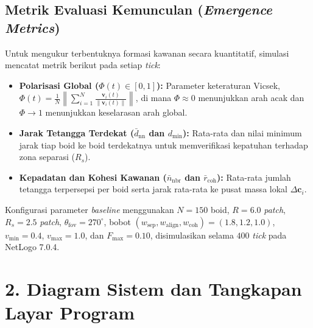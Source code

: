 \documentclass[11pt,a4paper]{article}
\begin{document}
\subsection*{Metrik Evaluasi Kemunculan (\textit{Emergence Metrics})}
Untuk mengukur terbentuknya formasi kawanan secara kuantitatif, simulasi mencatat metrik berikut pada setiap \textit{tick}:
\begin{itemize}
    \item \textbf{Polarisasi Global ($\Phi(t) \in [0, 1]$):} Parameter keteraturan Vicsek, $\Phi(t) = \frac{1}{N}\left\|\sum_{i=1}^{N} \frac{\mathbf{v}_i(t)}{\|\mathbf{v}_i(t)\|}\right\|$, di mana $\Phi \approx 0$ menunjukkan arah acak dan $\Phi \to 1$ menunjukkan keselarasan arah global.
    \item \textbf{Jarak Tetangga Terdekat ($\bar{d}_{\text{nn}}$ dan $d_{\min}$):} Rata-rata dan nilai minimum jarak tiap boid ke boid terdekatnya untuk memverifikasi kepatuhan terhadap zona separasi ($R_s$).
    \item \textbf{Kepadatan dan Kohesi Kawanan ($\bar{n}_{\text{nbr}}$ dan $\bar{r}_{\text{coh}}$):} Rata-rata jumlah tetangga terpersepsi per boid serta jarak rata-rata ke pusat massa lokal $\Delta \mathbf{c}_i$.
\end{itemize}

Konfigurasi parameter \textit{baseline} menggunakan $N = 150$ boid, $R = 6.0$ \textit{patch}, $R_s = 2.5$ \textit{patch}, $\theta_{\text{fov}} = 270^\circ$, bobot $(w_{\text{sep}}, w_{\text{align}}, w_{\text{coh}}) = (1.8, 1.2, 1.0)$, $v_{\min} = 0.4$, $v_{\max} = 1.0$, dan $F_{\max} = 0.10$, disimulasikan selama $400$ \textit{tick} pada NetLogo 7.0.4.

\newpage

\section*{2. Diagram Sistem dan Tangkapan Layar Program}
\end{document}
